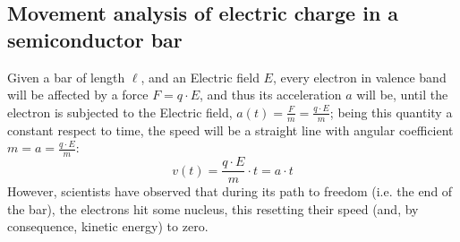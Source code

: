 \documentclass[12pt]{article}
\begin{document}
\subsection{Movement analysis of electric charge in a semiconductor bar}
Given a bar of length $\ell$, and an Electric field $E$, every electron in valence band will be affected by a force $F = q \cdot E$, and thus its acceleration $a$ will be, until the electron is subjected to the Electric field, $a(t)= \frac{F}{m} = \frac{q \cdot E}{m}$; being this quantity a constant respect to time, the speed will be a straight line with angular coefficient $m = a = \frac{q \cdot E}{ m}$:
\begin{equation}
v(t) = \frac{q \cdot E}{m} \cdot t = a \cdot t
\end{equation}
However, scientists have observed that during its path to freedom (i.e. the end of the bar), the electrons hit some nucleus, this resetting their speed (and, by consequence, kinetic energy) to zero. 
\end{document}
